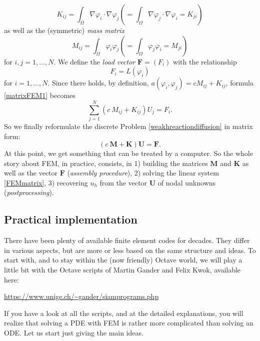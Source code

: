\documentclass{article}
\begin{document}
\[
K_{ij} = \int_\Omega \nabla \varphi_i \cdot \nabla \varphi_j
\left (= \int_\Omega \nabla \varphi_j \cdot \nabla \varphi_i = K_{ji} \right )
\]
as well as the (symmetric) \emph{mass matrix}
\[
M_{ij} = \int_\Omega \varphi_i  \varphi_j
\left (= \int_\Omega \varphi_j \varphi_i = M_{ji} \right )
\]
for $i,j=1,\ldots,N$.
We define the \emph{load vector} $\mathbf{F} = (F_i)$
with the relationship
\[
F_i = L(\varphi_i)
\]
for $i=1,\ldots,N$. Since there holds, by definition,
$a(\varphi_i,\varphi_j) = c M_{ij} + K_{ij}$, formula \eqref{matrixFEM1} becomes
\begin{equation*}
\sum_{j=1}^N 
\left ( c\ M_{ij} + K_{ij} \right )
U_j = F_i.    
\end{equation*}
So we finally reformulate the discrete Problem \eqref{weakhreactiondiffusion} in matrix form:
\begin{equation}
    \label{FEMmatrix}
    \left ( c \ \mathbf{M} + \mathbf{K}
    \right )\mathbf{U} = \mathbf{F}.
\end{equation}
At this point, we get something that can be treated by a computer. So the whole story about FEM, in practice, consists, in 1) building the matrices $\mathbf{M}$ and $\mathbf{K}$ as well as the vector $\mathbf{F}$ (\emph{assembly procedure}), 2) solving the linear system \eqref{FEMmatrix}, 3) recovering $u_h$ from the vector $\mathbf{U}$ of nodal unknowns (\emph{postprocessing}). 


\subsection{Practical implementation}

There have been plenty of available finite element codes for decades. They differ in various aspects, but are more or less based on the same structure and ideas. To start with, and to stay within the (now friendly) Octave world, we will play a little bit with the Octave scripts of Martin Gander and Felix Kwok, available here:

\begin{center}
\url{https://www.unige.ch/~gander/siamprograms.php}    
\end{center}


If you have a look at all the scripts, and at the detailed explanations, you will realize that solving a PDE with FEM is rather more complicated than solving an ODE. Let us start just giving the main ideas.
\end{document}
